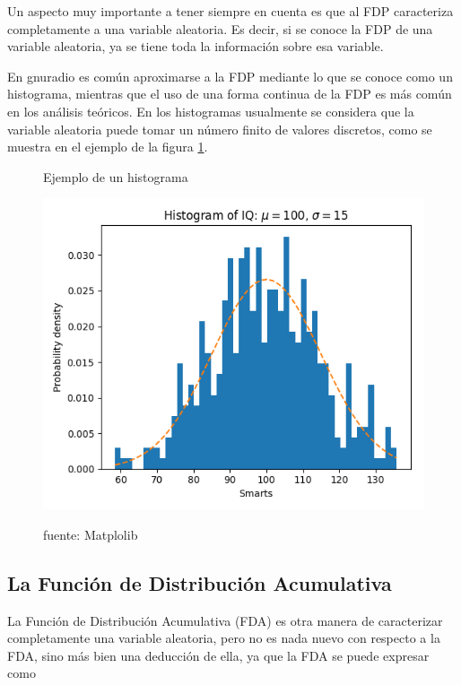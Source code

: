 Un aspecto muy importante a tener siempre en cuenta es que al FDP caracteriza completamente a una variable aleatoria. Es decir, si se conoce la FDP de una variable aleatoria, ya se tiene toda la información sobre esa variable.


En gnuradio es común aproximarse a la FDP mediante lo que se conoce como un histograma, mientras que el uso de una forma continua de la FDP es más común en los análisis teóricos. En los histogramas usualmente se considera que la variable aleatoria puede tomar un número finito de valores discretos, como se muestra en el ejemplo de la figura \ref{fig:histo}. 

\begin{figure}[h!]
	\captionsetup{justification = raggedright, singlelinecheck = false}
	\caption{Ejemplo de un histograma} 
	\centering
	\includegraphics[scale=0.5]{Imagenes/histogram_demo_features.png}
	\label{fig:histo}
  \caption*{fuente: Matplolib}
\end{figure}

\subsection{La Función de Distribución Acumulativa}
La Función de Distribución Acumulativa (FDA) es otra manera de caracterizar completamente una variable aleatoria, pero no es nada nuevo con respecto a la FDA, sino más bien una deducción de ella, ya que la FDA se puede expresar como

